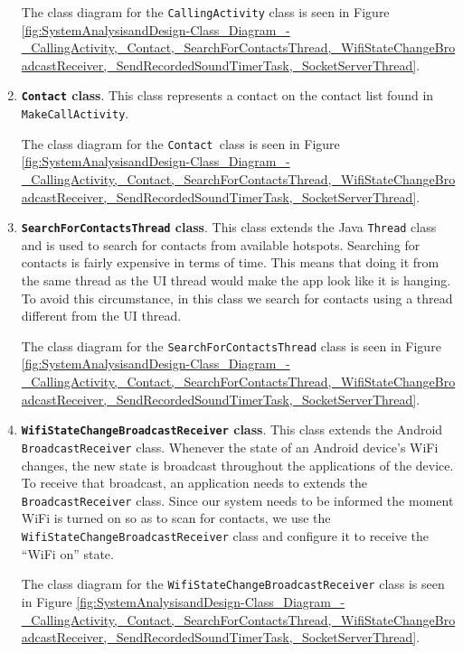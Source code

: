 \documentclass[12pt,svgnames,smaller]{article} %
\begin{document}
\begin{enumerate}
		The class diagram for the \texttt{CallingActivity} class is seen in Figure \ref{fig:SystemAnalysisandDesign-Class_Diagram_-_CallingActivity,_Contact,_SearchForContactsThread,_WifiStateChangeBroadcastReceiver,_SendRecordedSoundTimerTask,_SocketServerThread}.
		
		\item \textbf{\texttt{Contact} class}. This class represents a contact on the contact list found in \texttt{MakeCallActivity}.
		
		The class diagram for the \texttt{Contact }class is seen in Figure \ref{fig:SystemAnalysisandDesign-Class_Diagram_-_CallingActivity,_Contact,_SearchForContactsThread,_WifiStateChangeBroadcastReceiver,_SendRecordedSoundTimerTask,_SocketServerThread}.
		
		\item \textbf{\texttt{SearchForContactsThread} class}. This class extends the Java \texttt{Thread} class and is used to search for contacts from available hotspots. Searching for contacts is fairly expensive in terms of time. This means that doing it from the same thread as the UI thread would make the app look like it is hanging. To avoid this circumstance, in this class we search for contacts using a thread different from the UI thread.
		
		The class diagram for the \texttt{SearchForContactsThread} class is seen in Figure \ref{fig:SystemAnalysisandDesign-Class_Diagram_-_CallingActivity,_Contact,_SearchForContactsThread,_WifiStateChangeBroadcastReceiver,_SendRecordedSoundTimerTask,_SocketServerThread}.
		
		\item \textbf{\texttt{WifiStateChangeBroadcastReceiver} class}. This class extends the Android \texttt{BroadcastReceiver} class. Whenever the state of an Android device's WiFi changes, the new state is broadcast throughout the applications of the device. To receive that broadcast, an application needs to extends the \texttt{BroadcastReceiver} class. Since our system needs to be informed the moment WiFi is turned on so as to scan for contacts, we use the  \texttt{WifiStateChangeBroadcastReceiver} class and configure it to receive the “WiFi on” state.
		
		The class diagram for the \texttt{WifiStateChangeBroadcastReceiver} class is seen in Figure \ref{fig:SystemAnalysisandDesign-Class_Diagram_-_CallingActivity,_Contact,_SearchForContactsThread,_WifiStateChangeBroadcastReceiver,_SendRecordedSoundTimerTask,_SocketServerThread}.
		

\end{enumerate}
\end{document}
